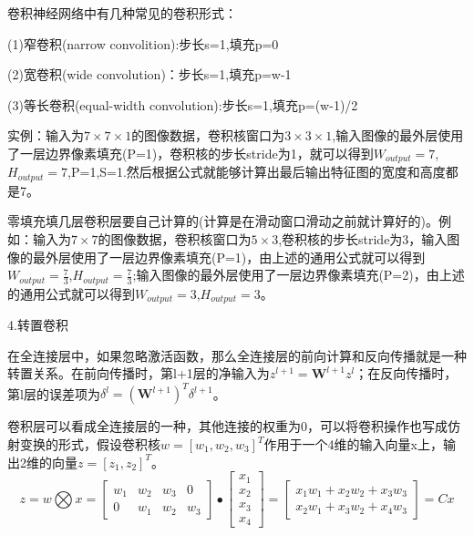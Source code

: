 \documentclass[openbib]{article}
\begin{document}
卷积神经网络中有几种常见的卷积形式：

(1)窄卷积(narrow convolition):步长s=1,填充p=0

(2)宽卷积(wide convolution)：步长s=1,填充p=w-1

(3)等长卷积(equal-width convolution):步长s=1,填充p=(w-1)/2

实例：输入为$7\times7\times1$的图像数据，卷积核窗口为$3\times3\times1$,输入图像的最外层使用了一层边界像素填充(P=1)，卷积核的步长stride为1，就可以得到$W_{output}=7$,$H_{output}=7$,P=1,S=1.然后根据公式就能够计算出最后输出特征图的宽度和高度都是7。

零填充填几层卷积层要自己计算的(计算是在滑动窗口滑动之前就计算好的)。例如：输入为$7\times7$的图像数据，卷积核窗口为$5\times3$,卷积核的步长stride为3，输入图像的最外层使用了一层边界像素填充(P=1)，由上述的通用公式就可以得到$W_{output}=\frac{7}{3}$,$H_{output}=\frac{7}{3}$;输入图像的最外层使用了一层边界像素填充(P=2)，由上述的通用公式就可以得到$W_{output}=3$,$H_{output}=3$。

4.转置卷积

在全连接层中，如果忽略激活函数，那么全连接层的前向计算和反向传播就是一种转置关系。在前向传播时，第l+1层的净输入为$z^{l+1} = \textbf{W}^{l+1}z^l$；在反向传播时，第l层的误差项为$\delta^l=(\textbf{W}^{l+1})^T\delta^{l+1}$。

卷积层可以看成全连接层的一种，其他连接的权重为0，可以将卷积操作也写成仿射变换的形式，假设卷积核$w=[w_1,w_2,w_3]^T$作用于一个4维的输入向量x上，输出2维的向量$z=[z_1,z_2]^T$。
$$z = w \bigotimes x= \begin{bmatrix}
	w_1 & w_2 &w_3  &0  \\
	0 & w_1 &w_2  & w_3
\end{bmatrix} \bullet \begin{bmatrix}
x_1 \\
x_2 \\
x_3 \\
x_4
\end{bmatrix} =\begin{bmatrix}
x_1w_1+x_2w_2+x_3w_3 \\x_2w_1+x_3w_2+x_4w_3 
\end{bmatrix}= Cx$$
\end{document}
